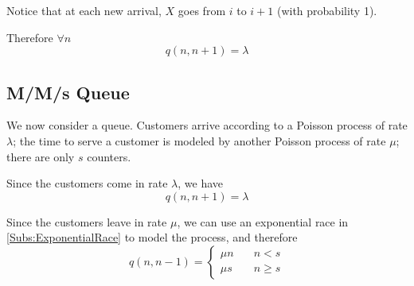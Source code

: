         Notice that at each new arrival, $X$ goes from $i$ to $i+1$ (with probability 1).
        
        Therefore $\forall n$
        \[ q(n, n+1) = \lambda \]

    \subsection{M/M/s Queue}
        We now consider a queue. Customers arrive according to a Poisson process of rate $\lambda$; the time to serve a customer is modeled by another Poisson process of rate $\mu$; there are only $s$ counters.

        Since the customers come in rate $\lambda$, we have
        \[ q(n, n+1) = \lambda \]

        Since the customers leave in rate $\mu$, we can use an exponential race in \ref{Subs:ExponentialRace} to model the process, and therefore
        \[ q(n, n-1) = \begin{cases}
            \mu n & \quad n < s\\
            \mu s & \quad n \ge s
        \end{cases} \]
